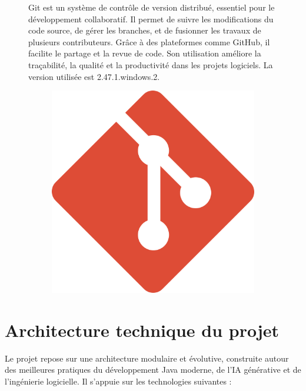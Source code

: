 \documentclass[12pt,a4paper]{report}
\begin{document}
	\begin{figure}[H]
		\begin{minipage}{0.8\textwidth}
			Git est un système de contrôle de version distribué, essentiel pour le développement collaboratif. Il permet de suivre les modifications du code source, de gérer les branches, et de fusionner les travaux de plusieurs contributeurs. Grâce à des plateformes comme GitHub, il facilite le partage et la revue de code. Son utilisation améliore la traçabilité, la qualité et la productivité dans les projets logiciels. La version utilisée est 2.47.1.windows.2.
		\end{minipage}
		\hfill
		\begin{minipage}{0.15\textwidth} 
			\begin{figure}[H]
				\centering
				\includegraphics[width=\linewidth]{git-logo.png}
				\label{fig:git-logo}
			\end{figure}
		\end{minipage}
	\end{figure}
	
	\section{Architecture technique du projet}
	
	Le projet repose sur une architecture modulaire et évolutive, construite autour des meilleures pratiques du développement Java moderne, de l'IA générative et de l’ingénierie logicielle. Il s’appuie sur les technologies suivantes :
	
\end{document}
